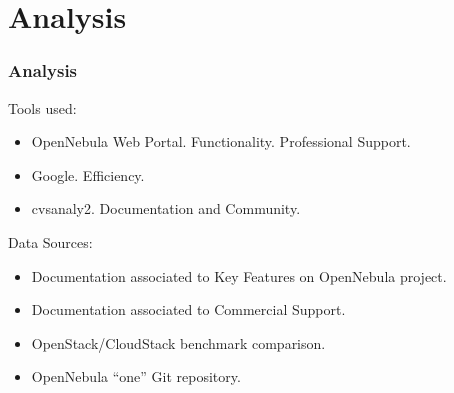 \section{Analysis}

\begin{frame}[allowframebreaks]
\frametitle{Analysis}
Tools used:
\begin{itemize}\itemsep0pt
\item{OpenNebula Web Portal}. Functionality. Professional Support.
\item{Google}. Efficiency.
\item{cvsanaly2}. Documentation and Community.
\end{itemize}
Data Sources:
\begin{itemize}\itemsep0pt
\item{Documentation associated to Key Features on OpenNebula project}.
\item{Documentation associated to Commercial Support}.
\item{OpenStack/CloudStack benchmark comparison}.
\item{OpenNebula ``one'' Git repository}.
\end{itemize}

\end{frame}
